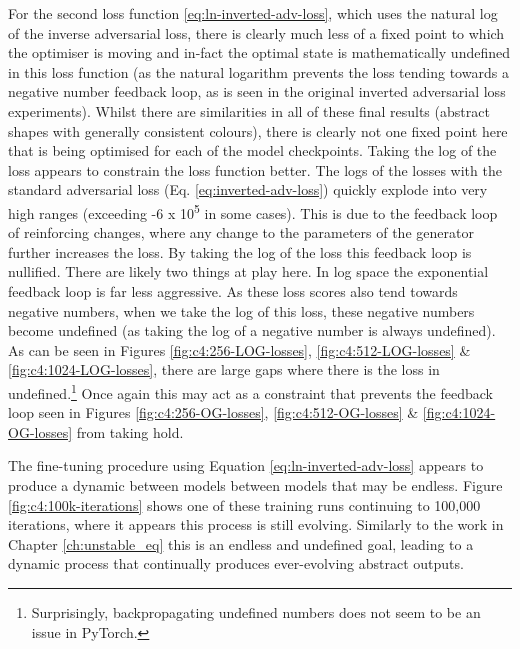 For the second loss function \ref{eq:ln-inverted-adv-loss}, which uses the natural log of the inverse adversarial loss, there is clearly much less of a fixed point to which the optimiser is moving and in-fact the optimal state is mathematically undefined in this loss function (as the natural logarithm prevents the loss tending towards a negative number feedback loop, as is seen in the original inverted adversarial loss experiments). 
Whilst there are similarities in all of these final results (abstract shapes with generally consistent colours), there is clearly not one fixed point here that is being optimised for each of the model checkpoints.
Taking the log of the loss appears to constrain the loss function better.
The logs of the losses with the standard adversarial loss (Eq. \ref{eq:inverted-adv-loss}) quickly explode into very high ranges (exceeding -6 x 10\textsuperscript{5} in some cases).
This is due to the feedback loop of reinforcing changes, where any change to the parameters of the generator further increases the loss.
By taking the log of the loss this feedback loop is nullified. 
There are likely two things at play here.
In log space the exponential feedback loop is far less aggressive. 
As these loss scores also tend towards negative numbers, when we take the log of this loss, these negative numbers become undefined (as taking the log of a negative number is always undefined).
As can be seen in Figures \ref{fig:c4:256-LOG-losses}, \ref{fig:c4:512-LOG-losses} \& \ref{fig:c4:1024-LOG-losses}, there are large gaps where there is the loss in undefined.\footnote{Surprisingly, backpropagating undefined numbers does not seem to be an issue in PyTorch.}
Once again this may act as a constraint that prevents the feedback loop seen in Figures \ref{fig:c4:256-OG-losses}, \ref{fig:c4:512-OG-losses} \& \ref{fig:c4:1024-OG-losses} from taking hold.

The fine-tuning procedure using Equation \ref{eq:ln-inverted-adv-loss} appears to produce a dynamic between models between models that may be endless. 
Figure \ref{fig:c4:100k-iterations} shows one of these training runs continuing to 100,000 iterations, where it appears this process is still evolving.
Similarly to the work in Chapter \ref{ch:unstable_eq} this is an endless and undefined goal, leading to a dynamic process that continually produces ever-evolving abstract outputs.

